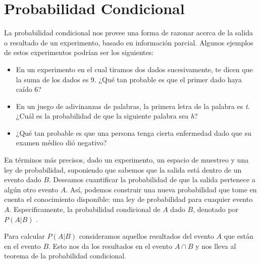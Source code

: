 
\section{Probabilidad Condicional}

La probabilidad condicional nos provee una forma de razonar acerca de la salida
o resultado de un experimento, basado en información parcial. Algunos ejemplos
de estos experimentos podrían ser los siguientes:

\begin{itemize}
\item En un experimento en el cual tiramos dos dados sucesivamente, te dicen que
la suma de los dados es 9. ¿Qué tan probable es que el primer dado haya caído 6?

\item En un juego de adivinanzas de palabras, la primera letra de la palabra es
\textit{t}. ¿Cuál es la probabilidad de que la siguiente palabra sea \textit{h}?

\item ¿Qué  tan probable es que una persona tenga cierta enfermedad dado que su
examen médico dió negativo?
\end{itemize}

En términos más precisos, dado un experimento, un espacio de muestreo y una ley
de probabilidad, suponiendo que sabemos que la salida está dentro de un evento
dado $B$. Deseamos cuantificar la probabilidad de que la salida pertenece a
algún otro evento $A$. Así, podemos construir una nueva probabilidad que tome en
cuenta el conocimiento disponible: una ley de probabilidad para cuaquier evento
$A$. Especificamente, la probabilidad condicional de $A$ dado $B$, denotado por
$P(A|B)$ \cite{vsirca2016probability}.

Para calcular $P(A|B)$ consideramos aquellos resultados del evento $A$ que están en
el evento $B$. Esto nos da los resultados en el evento $A \cap B$ y nos lleva al
teorema de la probabilidad condicional.

